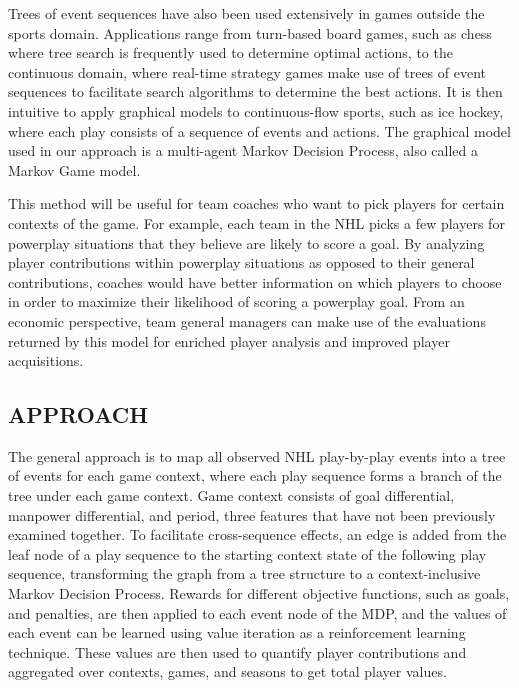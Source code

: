 \documentclass[]{article}
\begin{document}
Trees of event sequences have also been used extensively in games outside the sports domain. Applications range from turn-based board games, such as chess \citep{Berliner1979} where tree search is frequently used to determine optimal actions, to the continuous domain, where real-time strategy games \citep{Churchill2013} make use of trees of event sequences to facilitate search algorithms to determine the best actions. It is then intuitive to apply graphical models to continuous-flow sports, such as ice hockey, where each play consists of a sequence of events and actions. The graphical model used in our approach is a multi-agent Markov Decision Process, also called a Markov Game model.

This method will be useful for team coaches who want to pick players for certain contexts of the game. For example, each team in the NHL picks a few players for powerplay situations that they believe are likely to score a goal. By analyzing player contributions within powerplay situations as opposed to their general contributions, coaches would have better information on which players to choose in order to maximize their likelihood of scoring a powerplay goal. From an economic perspective, team general managers can make use of the evaluations returned by this model for enriched player analysis and improved player acquisitions.


\subsection{APPROACH}

The general approach is to map all observed NHL play-by-play events into a tree of events for each game context, where each play sequence forms a branch of the tree under each game context. Game context consists of goal differential, manpower differential, and period, three features that have not been previously examined together. To facilitate cross-sequence effects, an edge is added from the leaf node of a play sequence to the starting context state of the following play sequence, transforming the graph from a tree structure to a context-inclusive Markov Decision Process. Rewards for different objective functions, such as goals, and penalties, are then applied to each event node of the MDP, and the values of each event can be learned using value iteration as a reinforcement learning technique. These values are then used to quantify player contributions and aggregated over contexts, games, and seasons to get total player values.
\end{document}

